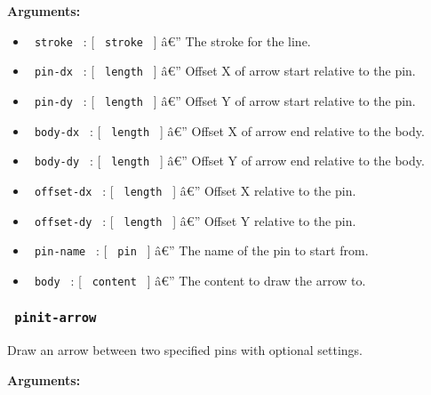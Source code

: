 \textbf{Arguments:}

\begin{itemize}
\tightlist
\item
  \texttt{\ stroke\ } : {[} \texttt{\ stroke\ } {]} â€'' The stroke for
  the line.
\item
  \texttt{\ pin-dx\ } : {[} \texttt{\ length\ } {]} â€'' Offset X of
  arrow start relative to the pin.
\item
  \texttt{\ pin-dy\ } : {[} \texttt{\ length\ } {]} â€'' Offset Y of
  arrow start relative to the pin.
\item
  \texttt{\ body-dx\ } : {[} \texttt{\ length\ } {]} â€'' Offset X of
  arrow end relative to the body.
\item
  \texttt{\ body-dy\ } : {[} \texttt{\ length\ } {]} â€'' Offset Y of
  arrow end relative to the body.
\item
  \texttt{\ offset-dx\ } : {[} \texttt{\ length\ } {]} â€'' Offset X
  relative to the pin.
\item
  \texttt{\ offset-dy\ } : {[} \texttt{\ length\ } {]} â€'' Offset Y
  relative to the pin.
\item
  \texttt{\ pin-name\ } : {[} \texttt{\ pin\ } {]} â€'' The name of the
  pin to start from.
\item
  \texttt{\ body\ } : {[} \texttt{\ content\ } {]} â€'' The content to
  draw the arrow to.
\end{itemize}

\subsubsection{\texorpdfstring{\texttt{\ pinit-arrow\ }}{ pinit-arrow }}\label{pinit-arrow}

Draw an arrow between two specified pins with optional settings.

\begin{Shaded}
\begin{Highlighting}[]
\end{Highlighting}
\end{Shaded}

\textbf{Arguments:}

